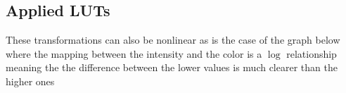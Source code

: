 \documentclass[letterpaper,10pt,english]{sphinxmanual}
\begin{document}
\begin{sphinxVerbatim}[commandchars=\\\{\}]
    \PYG{p}{[}\PYG{p}{]}
\end{sphinxVerbatim}

\noindent{}


\subsection{Applied LUTs}
\label{\detokenize{01-Introduction:applied-luts}}
\sphinxAtStartPar
These transformations can also be non\sphinxhyphen{}linear as is the case of the graph below where the mapping between the intensity and the color is a \(\log\) relationship meaning the the difference between the lower values is much clearer than the higher ones
\end{document}

